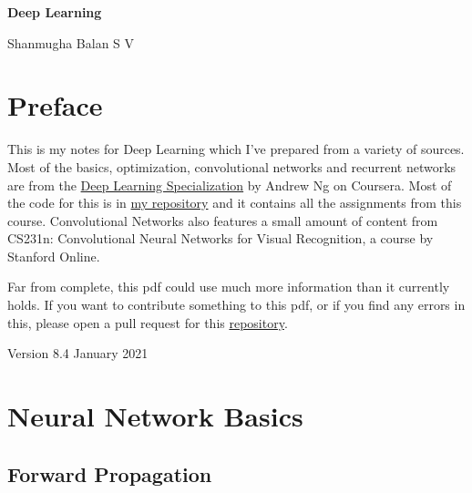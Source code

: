 \documentclass{article}
\begin{document}
\begin{titlepage}
   \begin{center}
       \vspace*{1cm}

       \huge{\textbf{Deep Learning}}
          
       \vspace{0.5cm}

       \Large{Shanmugha Balan S V}
      
   \end{center}
\end{titlepage}

\tableofcontents

\section*{Preface}
This is my notes for Deep Learning which I've prepared from a variety of sources. Most of the basics, optimization, convolutional networks and recurrent networks are from the \href{https://www.coursera.org/specializations/deep-learning}{Deep Learning Specialization} by Andrew Ng on Coursera. Most of the code for this is in \href{https://github.com/sbalan7/LearningDeepLearning}{my repository} and it contains all the assignments from this course. Convolutional Networks also features a small amount of content from CS231n: Convolutional Neural Networks for Visual Recognition, a course by Stanford Online. 

Far from complete, this pdf could use much more information than it currently holds. If you want to contribute something to this pdf, or if you find any errors in this, please open a pull request for this \href{https://github.com/sbalan7/LearningDeepLearning/}{repository}.

Version 8.4 
January 2021

\section{Neural Network Basics}

\subsection{Forward Propagation}
\end{document}
